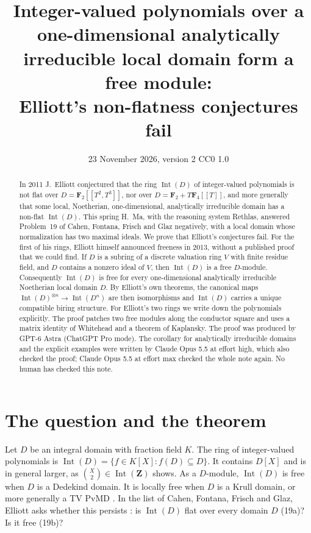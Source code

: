 \documentclass[11pt,a4paper]{article}
\title{Integer-valued polynomials over a one-dimensional analytically\\ irreducible local domain form a free module:\\ Elliott's non-flatness conjectures fail}
\author{}
\date{23 November 2026, version 2 \quad CC0 1.0}
\theoremstyle{plain}
\theoremstyle{remark}
\newcommand{\F}{\mathbf F}
\newcommand{\Int}{\operatorname{Int}}
\begin{document}
\maketitle

\begin{abstract}
\noindent
In 2011 J.~Elliott conjectured that the ring $\Int(D)$ of integer-valued polynomials is not flat over
$D=\F_2[[T^2,T^3]]$, nor over $D=\F_2+T\F_4[[T]]$, and more generally that some local, Noetherian,
one-dimensional, analytically irreducible domain has a non-flat $\Int(D)$. This spring H.~Ma, with the reasoning
system Rethlas, answered Problem~19 of Cahen, Fontana, Frisch and Glaz negatively, with a local domain whose
normalization has two maximal ideals. We prove that Elliott's conjectures fail. For the first of his rings,
Elliott himself announced freeness in 2013, without a published proof that we could find. If $D$ is a subring of a
discrete valuation ring $V$ with finite residue field, and $D$ contains a nonzero ideal of $V$, then $\Int(D)$ is a
free $D$-module. Consequently $\Int(D)$ is free for every one-dimensional analytically irreducible Noetherian local
domain $D$. By Elliott's own theorems, the canonical maps $\Int(D)^{\otimes n}\to\Int(D^n)$ are then isomorphisms and
$\Int(D)$ carries a unique compatible biring structure. For Elliott's two rings we write down the polynomials
explicitly. The proof patches two free modules along the conductor square and uses a matrix identity of
Whitehead and a theorem of Kaplansky. The proof was produced by GPT-6 Astra (ChatGPT Pro mode). The corollary
for analytically irreducible domains and the explicit examples were written by Claude Opus 5.5 at effort high,
which also checked the proof; Claude Opus 5.5 at effort max checked the whole note again. No human has checked
this note.
\end{abstract}

\section{The question and the theorem}

Let $D$ be an integral domain with fraction field $K$. The ring of integer-valued polynomials is
$\Int(D)=\{f\in K[X]: f(D)\subseteq D\}$. It contains $D[X]$ and is in general larger, as $\binom{X}{2}\in\Int(\mathbf Z)$ shows. As a $D$-module, $\Int(D)$ is free when $D$ is
a Dedekind domain. It is locally free when $D$ is a Krull domain, or more generally a TV PvMD
\cite[Theorem~1.2]{E11a}. In the list of Cahen, Fontana, Frisch and Glaz, Elliott asks whether this persists
\cite[Problem~19, p.~9]{CFFG}: is $\Int(D)$ flat over every domain $D$ (19a)? Is it free (19b)?
\end{document}

